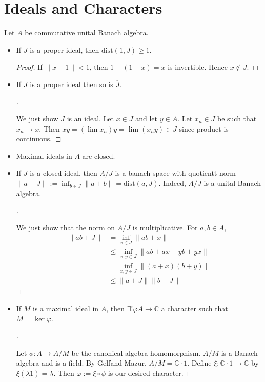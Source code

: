 \documentclass{article}
\theoremstyle{definition}
\newenvironment{proofs}[1][\proofname]{%
  \begin{proof}[#1]$ $\par\nobreak\ignorespaces
}{%
  \end{proof}
}
\newcommand{\CC}{\mathbb C}
\begin{document}
\section{Ideals and Characters}

Let $A$ be commutative unital Banach algebra.
\begin{itemize}
	\item If $J$ is a proper ideal, then $\text{dist}(1, J) \geq 1$.
		\begin{proof}
			If $\|x - 1\| < 1$, then $1 - (1 - x) = x$ is invertible.
			Hence $x \notin J$.
		\end{proof}

	\item If $J$ is a proper ideal then so is $\overline{J}$.
		\begin{proofs}
			We just show $\overline{J}$ is an ideal.
			Let $x \in \overline{J}$ and let $y \in A$.
			Let $x_n \in J$ be such that $x_n \to x$.
			Then $xy = (\lim x_n) y = \lim (x_n y) \in \overline{J}$ since product is continuous.
		\end{proofs}

	\item Maximal ideals in $A$ are closed.

	\item If $J$ is a closed ideal, then $A/J$ is a banach space with quotientt norm $\|a + J\| := \inf_{b \in J} \|a + b\| = \text{dist}(a, J)$.
		Indeed, $A/J$ is a unital Banach algebra.

		\begin{proofs}
			We just show that the norm on $A/J$ is multiplicative.
			For $a, b \in A$, 
			\[
				\begin{split}
					\|ab + J\| &= \inf_{x \in J} \|ab + x\| \\
					&\leq \inf_{x, y \in J} \|ab + ax + yb + yx\|\\
					&= \inf_{x, y \in J} \|(a + x) (b + y)\|\\
					&\leq \|a + J\| \|b + J\|
				\end{split}
			\]
		\end{proofs}

	\item If $M$ is a maximal ideal in $A$, then $\exists ! \varphi A \to \CC$ a character such that $M = \ker \varphi$.

		\begin{proofs}
			Let $\phi: A \to A/M$ be the canonical algebra homomorphism.
			$A/M$ is a Banach algebra and is a field.
			By Gelfand-Mazur, $A/M = \CC \cdot 1$.
			Define $\xi: \CC \cdot 1 \to \CC$ by $\xi(\lambda 1) = \lambda$.
			Then $\varphi:= \xi \circ \phi$ is our desired character.
		\end{proofs}


\end{itemize}
\end{document}
